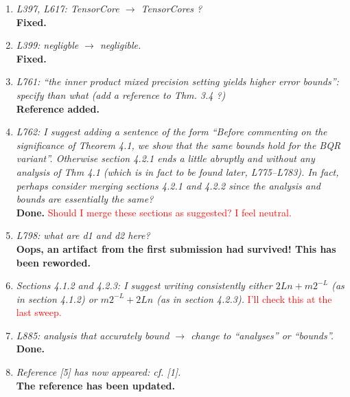 \documentclass[final,onefignum,onetabnum]{siamart190516}
\newcommand{\red}[1]{\textcolor{red}{#1}}
\begin{document}
\begin{enumerate}
    {\bf Fixed.}
    \item {\it L397, L617: TensorCore $\rightarrow$ TensorCores ?}\\
    {\bf Fixed.}
    \item {\it L399: negligble $\rightarrow$ negligible.}\\
    {\bf Fixed.}
    \item {\it L761: “the inner product mixed precision setting yields higher error bounds”: specify than what (add a reference to Thm. 3.4 ?)}\\
    {\bf Reference added.}
    \item {\it L762: I suggest adding a sentence of the form ``Before commenting on the significance of Theorem 4.1, we show that the same bounds hold for the BQR variant''. Otherwise section 4.2.1 ends a little abruptly and without any analysis of Thm 4.1 (which is in fact to be found later, L775–L783). In fact, perhaps consider merging sections 4.2.1 and 4.2.2 since the analysis and bounds are essentially the same?}\\
    {\bf Done.}\red{ Should I merge these sections as suggested? I feel neutral.}
    \item {\it L798: what are d1 and d2 here?}\\
    {\bf Oops, an artifact from the first submission had survived! This has been reworded.}
    \item {\it Sections 4.1.2 and 4.2.3: I suggest writing consistently either $2Ln + m2^{-L}$ (as in
section 4.1.2) or $m2^{-L} + 2Ln$ (as in section 4.2.3).}
\red{I'll check this at the last sweep.}
    \item {\it L885: analysis that accurately bound $\rightarrow$ change to ``analyses'' or ``bounds''.}\\
    {\bf Done.}
    \item {\it Reference [5] has now appeared: cf. [1].} \\
    {\bf The reference has been updated.}
\end{enumerate}


\end{document}
